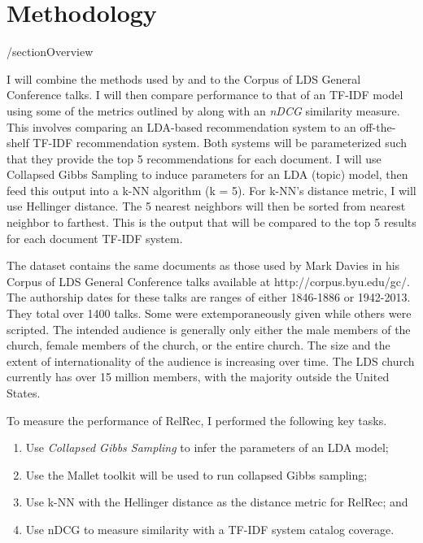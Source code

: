 \chapter{Methodology} \label{chp:chapter2}

/section{Overview}

I will combine the methods used by \citeyearpar{hall-jurafsky-manning:2008:EMNLP}
and \citeyearpar{Krstovski2013efficient}
to the Corpus of LDS General Conference talks. I will then compare performance to that of an TF-IDF model using some of the metrics outlined by \citeyearpar{Ge:2010:BAE:1864708.1864761}
along with an \emph{nDCG} similarity measure. This involves comparing an LDA-based recommendation system to an off-the-shelf TF-IDF recommendation system. Both systems will be parameterized such that they provide the top 5 recommendations for each document. I will use Collapsed Gibbs Sampling to induce parameters for an LDA (topic) model, then feed this output into a k-NN algorithm (k = 5). For k-NN’s distance metric, I will use Hellinger distance. The 5 nearest neighbors will then be sorted from nearest neighbor to farthest. This is the output that will be compared to the top 5 results for each document TF-IDF system.

The dataset contains the same documents as those used by Mark Davies in his Corpus of LDS General Conference talks available at http://corpus.byu.edu/gc/. The authorship dates for these talks are ranges of either 1846-1886 or 1942-2013. They total over 1400 talks. Some were extemporaneously given while others were scripted. The intended audience is generally only either the male members of the church, female members of the church, or the entire church. The size and the extent of internationality of the audience is increasing over time. The LDS church currently has over 15 million members, with the majority outside the United States.

To measure the performance of RelRec, I performed the following key tasks.

\begin{enumerate}
	\item Use \textit{Collapsed Gibbs Sampling} to infer the parameters of an LDA model;
	\item Use the Mallet toolkit will be used to run collapsed Gibbs sampling;
	\item Use k-NN with the Hellinger distance as the distance metric for RelRec; and
	\item Use nDCG to measure similarity with a TF-IDF system catalog coverage.
\end{enumerate}

